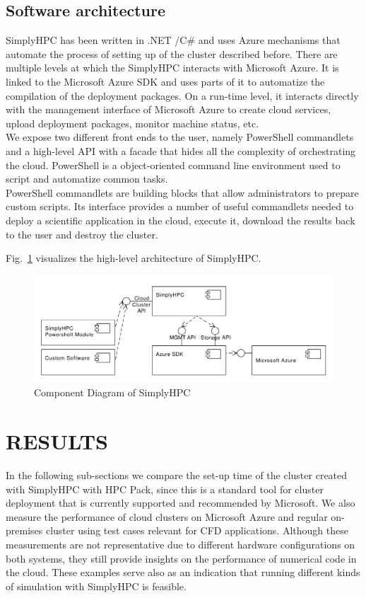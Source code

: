 \documentclass[a4paper,twoside]{article}
\begin{document}
\subsection{Software architecture}

SimplyHPC has been written in .NET  /C\# and uses Azure mechanisms that automate the process of setting up of the cluster described before. There are multiple levels at which the SimplyHPC interacts with Microsoft Azure. It is linked to the Microsoft Azure SDK and uses parts of it to automatize the compilation of the deployment packages. On a run-time level, it interacts directly with the management interface of Microsoft Azure to create cloud services, upload deployment packages, monitor machine status, etc.\\
We expose two different front ends to the user, namely PowerShell commandlets and a high-level API with a facade that hides all the complexity of orchestrating the cloud.  PowerShell is a object-oriented command line environment used to script and automatize common tasks.\\
PowerShell commandlets are building blocks that allow administrators to prepare custom scripts. Its interface provides a number of useful commandlets needed to deploy a scientific application in the cloud, execute it, download the results back to the user and destroy the cluster. %


Fig.~\ref{fig:simplyHPCArch} visualizes the high-level architecture of SimplyHPC.

\begin{figure}[!ht]
\centering
\vspace{-0.2cm}
	\includegraphics[width=\linewidth]{simplyHPCArch}
	\caption{Component Diagram of SimplyHPC}
	\label{fig:simplyHPCArch}
\end{figure}


\section{\uppercase{Results}}
\label{sec:results}
In the following sub-sections we compare the set-up time of the cluster created with SimplyHPC with HPC Pack, since this is a standard tool for cluster deployment that is currently supported and recommended by Microsoft. We also measure the performance of cloud clusters on Microsoft Azure and regular on-premises cluster using test cases relevant for CFD applications. Although these measurements are not representative due to different hardware configurations on both systems, they still provide insights on the performance of numerical code in the cloud. These examples serve also as an indication that running different kinds of simulation with SimplyHPC is feasible. 
\end{document}
